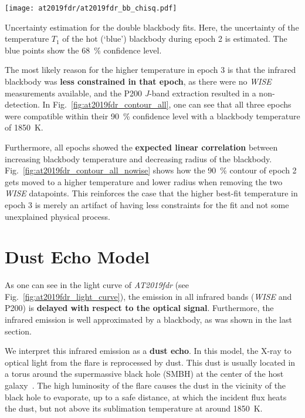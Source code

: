\begin{marginfigure}
    \texttt{[image: at2019fdr/at2019fdr\_bb\_chisq.pdf]}
    \caption[Uncertainty estimation for double BB fit]{Uncertainty estimation for the double blackbody fits. Here, the uncertainty of the temperature $T_1$ of the hot (`blue') blackbody during epoch 2 is estimated. The blue points show the \SI{68}{\percent} confidence level.}
\end{marginfigure}

The most likely reason for the higher temperature in epoch 3 is that the infrared blackbody was \textbf{less constrained in that epoch}, as there were no \textit{WISE} measurements available, and the P200 \textit{J}-band extraction resulted in a non-detection. In Fig.~\ref{fig:at2019fdr_contour_all}, one can see that all three epochs were compatible within their \SI{90}{\percent} confidence level with a blackbody temperature of \SI{1850}{\K}.


Furthermore, all epochs showed the \textbf{expected linear correlation} between increasing blackbody temperature and decreasing radius of the blackbody. Fig.~\ref{fig:at2019fdr_contour_all_nowise} shows how the \SI{90}{\percent} contour of epoch 2 gets moved to a higher temperature and lower radius when removing the two \textit{WISE} datapoints. This reinforces the case that the higher best-fit temperature in epoch 3 is merely an artifact of having less constraints for the fit and not some unexplained physical process.

\section{Dust Echo Model}\label{dust_echo}
As one can see in the light curve of \emph{AT2019fdr} (see Fig.~\ref{fig:at2019fdr_light_curve}), the emission in all infrared bands (\textit{WISE} and P200) is \textbf{delayed with respect to the optical signal}. Furthermore, the infrared emission is well approximated by a blackbody, as was shown in the last section.

We interpret this infrared emission as a \textbf{dust echo}. In this model, the X-ray to optical light from the flare is reprocessed by dust. This dust is usually located in a torus around the supermassive black hole (SMBH) at the center of the host galaxy~. The high luminosity of the flare causes the dust in the vicinity of the black hole to evaporate, up to a safe distance, at which the incident flux heats the dust, but not above its sublimation temperature at around \SI{1850}{\K}.

